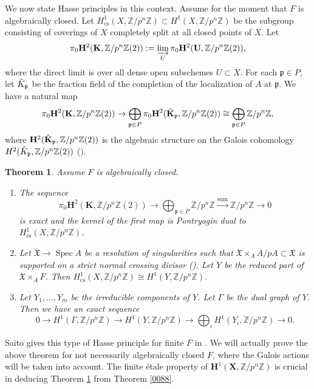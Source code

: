 \documentclass{amsart}
\newtheorem{Thm}{Theorem}[section]
\theoremstyle{remark}
\numberwithin{equation}{section}
\newcommand{\Z}{\mathbb{Z}}
\newcommand{\dirlim}{\varinjlim}
\newcommand{\alg}[1]{\mathbf{#1}}
\newcommand{\ideal}[1]{\mathfrak{#1}}
\newcommand{\cs}{\mathrm{cs}}
\DeclareMathOperator{\Spec}{Spec}
\begin{document}
We now state Hasse principles in this context.
Assume for the moment that $F$ is algebraically closed.
Let $H^{1}_{\cs}(X, \Z / p^{n} \Z) \subset H^{1}(X, \Z / p^{n} \Z)$
be the subgroup consisting of coverings of $X$ completely split at all closed points of $X$.
Let
	\[
			\pi_{0} \alg{H}^{2}(\alg{K}, \Z / p^{n} \Z(2))
		:=
			\dirlim_{U}
				\pi_{0} \alg{H}^{2}(\alg{U}, \Z / p^{n} \Z(2)),
	\]
where the direct limit is over all dense open subschemes $U \subset X$.
For each $\ideal{p} \in P$,
let $\Hat{K}_{\ideal{p}}$ be the fraction field
of the completion of the localization of $A$ at $\ideal{p}$.
We have a natural map
	\[
			\pi_{0} \alg{H}^{2}(\alg{K}, \Z / p^{n} \Z(2))
		\to
			\bigoplus_{\ideal{p} \in P}
				\pi_{0} \alg{H}^{2}(\Hat{\alg{K}}_{\ideal{p}}, \Z / p^{n} \Z(2))
		\cong
			\bigoplus_{\ideal{p} \in P}
				\Z / p^{n} \Z,
	\]
where $\alg{H}^{2}(\Hat{\alg{K}}_{\ideal{p}}, \Z / p^{n} \Z(2))$ is the algebraic structure on
the Galois cohomology $H^{2}(\Hat{K}_{\ideal{p}}, \Z / p^{n} \Z(2))$
(\cite[Theorem 6.4.2 (1)]{Suz24}).

\begin{Thm} \label{0109}
	Assume $F$ is algebraically closed.
	\begin{enumerate}
		\item
			The sequence
				\[
						\pi_{0} \alg{H}^{2}(\alg{K}, \Z / p^{n} \Z(2))
					\to
						\bigoplus_{\ideal{p} \in P}
							\Z / p^{n} \Z
					\stackrel{\mathrm{sum}}{\to}
						\Z / p^{n} \Z
					\to
						0
				\]
			is exact and the kernel of the first map is Pontryagin dual to
			$H^{1}_{\cs}(X, \Z / p^{n} \Z)$.
		\item
			Let $\mathfrak{X} \to \Spec A$ be a resolution of singularities
			such that $\mathfrak{X} \times_{A} A / p A \subset \mathfrak{X}$ is
			supported on a strict normal crossing divisor
			(\cite[Tag 0BIC]{Sta22}).
			Let $Y$ be the reduced part of $\mathfrak{X} \times_{A} F$.
			Then $H^{1}_{\cs}(X, \Z / p^{n} \Z) \cong H^{1}(Y, \Z / p^{n} \Z)$.
		\item
			Let $Y_{1}, \dots, Y_{m}$ be the irreducible components of $Y$.
			Let $\Gamma$ be the dual graph of $Y$.
			Then we have an exact sequence
				\[
						0
					\to
						H^{1}(\Gamma, \Z / p^{n} \Z)
					\to
						H^{1}(Y, \Z / p^{n} \Z)
					\to
						\bigoplus_{i}
							H^{1}(Y_{i}, \Z / p^{n} \Z)
					\to
						0.
				\]
	\end{enumerate}
\end{Thm}

Saito gives this type of Hasse principle for finite $F$ in \cite{Sai87}.
We will actually prove the above theorem for not necessarily algebraically closed $F$,
where the Galois actions will be taken into account.
The finite \'etale property of $\alg{H}^{1}(\alg{X}, \Z / p^{n} \Z)$
is crucial in deducing Theorem \ref{0109} from Theorem \ref{0088}.
\end{document}
